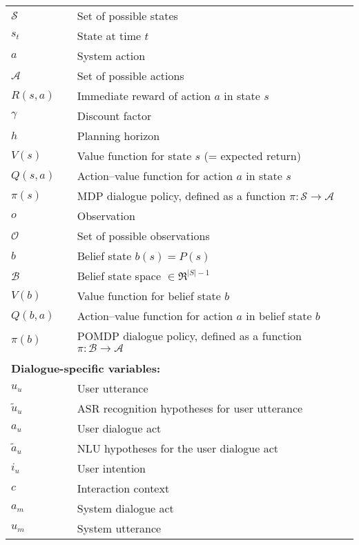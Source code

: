 \begin{longtable}{lp{5mm}p{11cm}}
$\mathcal{S}$ && Set of possible states \\
$s_t$ && State at time $t$ \\
$a$ && System action \\ 
$\mathcal{A}$ && Set of possible actions \\
$R(s,a)$ && Immediate reward of action $a$ in state $s$ \\
$\gamma$ && Discount factor \\
$h$ && Planning horizon \\
$V(s)$ && Value function for state $s$ (= expected return) \\
$Q(s,a)$ && Action--value function for action $a$ in state $s$  \\
$\pi(s)$ && MDP dialogue policy, defined as a function $\pi: \mathcal{S} \rightarrow \mathcal{A} $ \\
$o$ && Observation \\
$\mathcal{O}$ && Set of possible observations \\
$b$ && Belief state $b(s) = P(s)$ \\
$\mathcal{B}$ && Belief state space $\in \Re^{|S|-1}$ \\
$V(b)$ && Value function for belief state $b$  \\
$Q(b,a)$ && Action--value function for action $a$ in belief state $b$ \\
$\pi(b)$ && POMDP dialogue policy, defined as a function $\pi: \mathcal{B} \rightarrow \mathcal{A} $ \\


&&  \vspace{3mm} \\
\multicolumn{3}{l}{\textbf{Dialogue-specific variables:}} \vspace{2mm} \\

$u_u$ && User utterance \\
$\tilde{u}_u$ && ASR recognition hypotheses for user utterance \\
$a_u$ && User dialogue act \\
$\tilde{a}_u$ && NLU hypotheses for the user dialogue act \\
$i_u$ && User intention \\
$c$ && Interaction context \\
$a_m$ && System dialogue act \\
$u_m$ && System utterance \\


\end{longtable}
